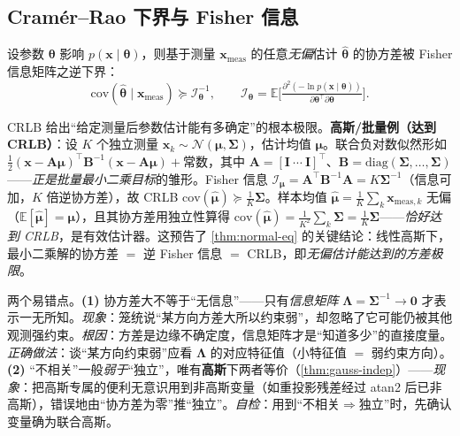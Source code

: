 \subsection{Cramér–Rao 下界与 Fisher 信息}
\label{sec:est-crlb}

\begin{theorem}\label{thm:crlb}
设参数 $\boldsymbol{\theta}$ 影响 $p(\mathbf{x}\mid\boldsymbol{\theta})$，则基于测量 $\mathbf{x}_{\text{meas}}$ 的任意\emph{无偏}估计 $\hat{\boldsymbol{\theta}}$ 的协方差被 Fisher 信息矩阵之逆下界：
\begin{equation}
  \mathrm{cov}(\hat{\boldsymbol{\theta}}\mid\mathbf{x}_{\text{meas}})\succeq\boldsymbol{\mathcal{I}}_{\boldsymbol{\theta}}^{-1},\qquad
  \boldsymbol{\mathcal{I}}_{\boldsymbol{\theta}}=\mathbb{E}\Big[\tfrac{\partial^2(-\ln p(\mathbf{x}\mid\boldsymbol{\theta}))}{\partial\boldsymbol{\theta}^\top\partial\boldsymbol{\theta}}\Big].
  \label{eq:crlb}
\end{equation}
\end{theorem}
\noindent CRLB 给出“给定测量后参数估计能有多确定”的根本极限。\textbf{高斯/批量例（达到 CRLB）}：设 $K$ 个独立测量 $\mathbf{x}_k\sim\mathcal{N}(\boldsymbol{\mu},\boldsymbol{\Sigma})$，估计均值 $\boldsymbol{\mu}$。联合负对数似然形如 $\tfrac12(\mathbf{x}-\mathbf{A}\boldsymbol{\mu})^\top\mathbf{B}^{-1}(\mathbf{x}-\mathbf{A}\boldsymbol{\mu})+\text{常数}$，其中 $\mathbf{A}=[\mathbf{I}\ \cdots\ \mathbf{I}]^\top$、$\mathbf{B}=\mathrm{diag}(\boldsymbol{\Sigma},\dots,\boldsymbol{\Sigma})$——\emph{正是批量最小二乘目标}的雏形。Fisher 信息 $\boldsymbol{\mathcal{I}}_{\boldsymbol{\mu}}=\mathbf{A}^\top\mathbf{B}^{-1}\mathbf{A}=K\boldsymbol{\Sigma}^{-1}$（信息可加，$K$ 倍逆协方差），故 CRLB $\mathrm{cov}(\hat{\boldsymbol{\mu}})\succeq\tfrac1K\boldsymbol{\Sigma}$。样本均值 $\hat{\boldsymbol{\mu}}=\tfrac1K\sum_k\mathbf{x}_{\text{meas},k}$ 无偏（$\mathbb{E}[\hat{\boldsymbol{\mu}}]=\boldsymbol{\mu}$），且其协方差用独立性算得 $\mathrm{cov}(\hat{\boldsymbol{\mu}})=\tfrac1{K^2}\sum_k\boldsymbol{\Sigma}=\tfrac1K\boldsymbol{\Sigma}$——\emph{恰好达到 CRLB}，是有效估计器。这预告了 \cref{thm:normal-eq} 的关键结论：线性高斯下，最小二乘解的协方差 $=$ 逆 Fisher 信息 $=$ CRLB，即\emph{无偏估计能达到的方差极限}。

\begin{pitfall}[概念误区：协方差“大”当成“没用”，以及不相关$=$独立]
两个易错点。\textbf{(1)} 协方差大不等于“无信息”——只有\emph{信息矩阵} $\boldsymbol{\Lambda}=\boldsymbol{\Sigma}^{-1}\to\mathbf{0}$ 才表示一无所知。\emph{现象}：笼统说“某方向方差大所以约束弱”，却忽略了它可能仍被其他观测强约束。\emph{根因}：方差是边缘不确定度，信息矩阵才是“知道多少”的直接度量。\emph{正确做法}：谈“某方向约束弱”应看 $\boldsymbol{\Lambda}$ 的对应特征值（小特征值 $=$ 弱约束方向）。\textbf{(2)} “不相关”一般\emph{弱于}“独立”，唯有\textbf{高斯}下两者等价（\cref{thm:gauss-indep}）——\emph{现象}：把高斯专属的便利无意识用到非高斯变量（如重投影残差经过 atan2 后已非高斯），错误地由“协方差为零”推“独立”。\emph{自检}：用到“不相关$\Rightarrow$独立”时，先确认变量确为联合高斯。
\end{pitfall}

